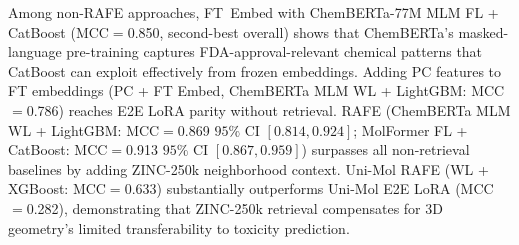 \documentclass[pdflatex,sn-mathphys-num]{sn-jnl}%
\theoremstyle{thmstyleone}%
\theoremstyle{thmstyletwo}%
\theoremstyle{thmstylethree}%
\begin{document}
Among non-RAFE approaches, FT~Embed with ChemBERTa-77M MLM FL + CatBoost (MCC$=$0.850, second-best overall) shows that ChemBERTa's masked-language pre-training captures FDA-approval-relevant chemical patterns that CatBoost can exploit effectively from frozen embeddings. Adding PC features to FT embeddings (PC + FT Embed, ChemBERTa MLM WL + LightGBM: MCC$=$0.786) reaches E2E LoRA parity without retrieval. RAFE (ChemBERTa MLM WL + LightGBM: MCC$=$0.869 $95\%$ CI $[0.814, 0.924]$; MolFormer FL + CatBoost: MCC$=$0.913 $95\%$ CI $[0.867, 0.959]$) surpasses all non-retrieval baselines by adding ZINC-250k neighborhood context. Uni-Mol RAFE (WL + XGBoost: MCC$=$0.633) substantially
outperforms Uni-Mol E2E LoRA (MCC$=$0.282), demonstrating that ZINC-250k retrieval compensates for 3D geometry's limited transferability to toxicity prediction.
\end{document}
